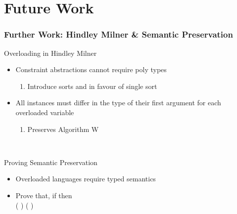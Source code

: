 \documentclass[aspectratio=169]{beamer}
\begin{document}
\section{Future Work}

\begin{frame}[fragile]
  \frametitle{Further Work: Hindley Milner \& Semantic Preservation}
  \begin{block}{Overloading in Hindley Milner}
    \
    \begin{itemize}
      \item Constraint abstractions cannot require poly types
      \begin{enumerate}
        \item Introduce sorts  and  in favour of single sort 
      \end{enumerate}
      \item All instances must differ in the type of their first argument for each overloaded variable
	    \begin{enumerate}
        \item Preserves Algorithm W
      \end{enumerate}
    \end{itemize}
    \
  \end{block}
  \begin{block}{Proving Semantic Preservation}
    \
    \begin{itemize}
      \item Overloaded languages require typed semantics
      \item Prove that, if    then \\  \Constr{[}  \Constr{]} (   )  (   ) 
    \end{itemize}
    \
  \end{block}
\end{frame}
\end{document}
